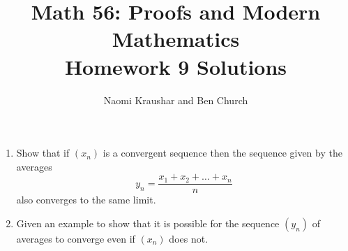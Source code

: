 \documentclass[12pt]{article}
\theoremstyle{definition}
\theoremstyle{definition}
\begin{document}
\title{Math 56: Proofs and Modern Mathematics\\ Homework 9 Solutions}
\author{Naomi Kraushar and Ben Church}
\maketitle


\begin{prob}
\begin{enumerate}[label=(\alph*)]
\item Show that if $(x_n)$ is a convergent sequence then the sequence given by the averages
\[y_n=\frac{x_1+x_2+\dots+x_n}{n}\]
also converges to the same limit.

\item Given an example to show that it is possible for the sequence $(y_n)$ of averages to converge even if $(x_n)$ does not.
\end{enumerate}
\end{prob}
\end{document}
